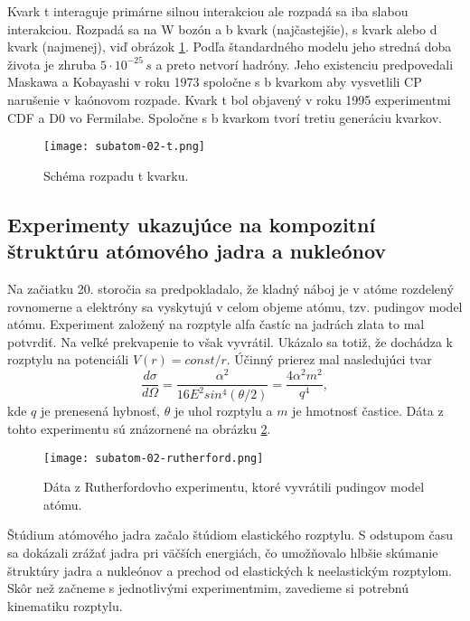 \documentclass[../../main.tex]{subfiles}
\begin{document}
Kvark t interaguje primárne silnou interakciou ale rozpadá sa iba slabou interakciou. Rozpadá sa na W bozón a b kvark (najčastejšie), s kvark alebo d kvark (najmenej), viď obrázok \ref{sf2:fig:t}. Podľa štandardného modelu jeho stredná doba života je zhruba $5\cdot 10^{-25}\,\unit{s}$ a preto netvorí hadróny. Jeho existenciu predpovedali Maskawa a Kobayashi v roku 1973 spoločne s b kvarkom aby vysvetlili CP narušenie v kaónovom rozpade. Kvark t bol objavený v roku 1995 experimentmi CDF a D0 vo Fermilabe. Spoločne s b kvarkom tvorí tretiu generáciu kvarkov.

\begin{figure}[!h]
\texttt{[image: subatom-02-t.png]}
\centering
\caption{Schéma rozpadu t kvarku.}
\label{sf2:fig:t}
\end{figure}

\subsection{Experimenty ukazujúce na kompozitní štruktúru atómového
jadra a nukleónov}

Na začiatku 20. storočia sa predpokladalo, že kladný náboj je v atóme rozdelený rovnomerne a elektróny sa vyskytujú v celom objeme atómu, tzv. pudingov model atómu. Experiment založený na rozptyle alfa častíc na jadrách zlata to mal potvrdiť. Na veľké prekvapenie to však vyvrátil. Ukázalo sa totiž, že dochádza k rozptylu na potenciáli $V(r)=const/r$. Účinný prierez mal nasledujúci tvar
$$ \frac{d\sigma}{d\Omega} = \frac{\alpha^2}{16 E^2 sin^4(\theta/2)} = \frac{4\alpha^2m^2}{q^4},$$
kde $q$ je prenesená hybnosť, $\theta$ je uhol rozptylu a $m$ je hmotnosť častice. Dáta z tohto experimentu sú znázornené na obrázku \ref{sf2:fig:rutherford}.

\begin{figure}[!h]
\texttt{[image: subatom-02-rutherford.png]}
\centering
\caption{Dáta z Rutherfordovho experimentu, ktoré vyvrátili pudingov model atómu.}
\label{sf2:fig:rutherford}
\end{figure}

Štúdium atómového jadra začalo štúdiom elastického rozptylu. S odstupom času sa dokázali zrážať jadra pri väčších energiách, čo umožňovalo hlbšie skúmanie štruktúry jadra a nukleónov a prechod od elastických k neelastickým rozptylom. Skôr než začneme s jednotlivými experimentmim, zavedieme si potrebnú kinematiku rozptylu.
\end{document}
